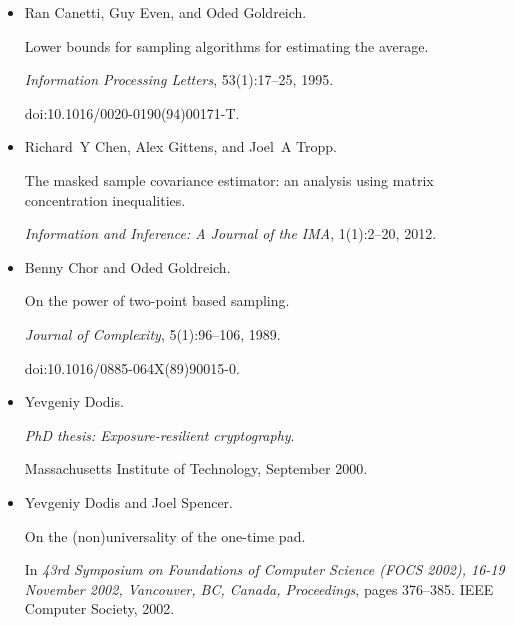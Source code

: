 \begin{itemize}
doi:10.1007/3-540-45539-6\_33.





\item[] 
[10]

Ran Canetti, Guy Even, and Oded Goldreich.


Lower bounds for sampling algorithms for estimating the average.


\emph{Information Processing Letters}, 53(1):17–25, 1995.


doi:10.1016/0020-0190(94)00171-T.





\item[] 
[11]

Richard Y Chen, Alex Gittens, and Joel A Tropp.


The masked sample covariance estimator: an analysis using matrix
concentration inequalities.


\emph{Information and Inference: A Journal of the IMA}, 1(1):2–20,
2012.





\item[] 
[12]

Benny Chor and Oded Goldreich.


On the power of two-point based sampling.


\emph{Journal of Complexity}, 5(1):96–106, 1989.


doi:10.1016/0885-064X(89)90015-0.





\item[] 
[13]

Yevgeniy Dodis.


\emph{PhD thesis: Exposure-resilient cryptography}.


Massachusetts Institute of Technology, September 2000.





\item[] 
[14]

Yevgeniy Dodis and Joel Spencer.


On the (non)universality of the one-time pad.


In \emph{43rd Symposium on Foundations of Computer Science (FOCS
2002), 16-19 November 2002, Vancouver, BC, Canada, Proceedings}, pages
376–385. IEEE Computer Society, 2002.






\end{itemize}
